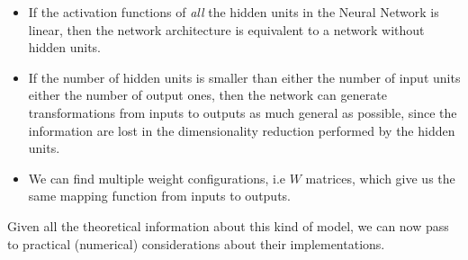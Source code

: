 \documentclass{standalone}
\begin{document}
\begin{itemize}

\item If the activation functions of \emph{all} the hidden units in the Neural Network is linear, then the network architecture is equivalent to a network without hidden units.

\item If the number of hidden units is smaller than either the number of input units either the number of output ones, then the network can generate transformations from inputs to outputs as much general as possible, since the information are lost in the dimensionality reduction performed by the hidden units.

\item We can find multiple weight configurations, i.e $W$ matrices, which give us the same mapping function from inputs to outputs.

\end{itemize}

Given all the theoretical information about this kind of model, we can now pass to practical (numerical) considerations about their implementations.
\end{document}
